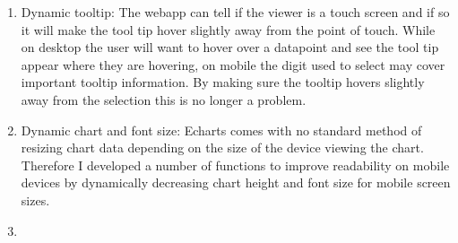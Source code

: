 \begin{enumerate}
    \item Dynamic tooltip: The webapp can tell if the viewer is a touch screen
          and if so it will make the tool tip hover slightly away from the point
          of touch. While on desktop the user will want to hover over a
          datapoint and see the tool tip appear where they are hovering, on
          mobile the digit used to select may cover important tooltip
          information. By making sure the tooltip hovers slightly away from the
          selection this is no longer a problem.
    \item Dynamic chart and font size: Echarts comes with no standard method of
          resizing chart data depending on the size of the device viewing the
          chart. Therefore I developed a number of functions to improve
          readability on mobile devices by dynamically decreasing chart height
          and font size for mobile screen sizes.
    \item
\end{enumerate}




